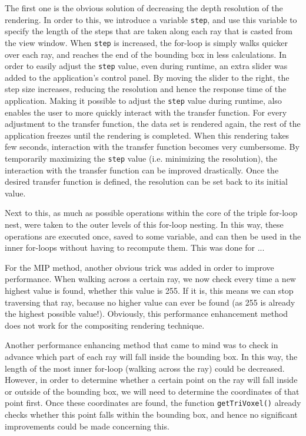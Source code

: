 The first one is the obvious solution of decreasing the depth resolution of the rendering. In order to this, we introduce a variable \texttt{step}, and use this variable to specify the length of the steps that are taken along each ray that is casted from the view window. When \texttt{step} is increased, the for-loop is simply walks quicker over each ray, and reaches the end of the bounding box in less calculations. In order to easily adjust the \texttt{step} value, even during runtime, an extra slider was added to the application's control panel. By moving the slider to the right, the step size increases, reducing the resolution and hence the response time of the application. 
Making it possible to adjust the \texttt{step} value during runtime, also enables the user to more quickly interact with the transfer function. For every adjustment to the transfer function, the data set is rendered again, the rest of the application freezes until the rendering is completed. When this rendering takes few seconds, interaction with the transfer function becomes very cumbersome. By temporarily maximizing the \texttt{step} value (i.e. minimizing the resolution), the interaction with the transfer function can be improved drastically. Once the desired transfer function is defined, the resolution can be set back to its initial value.

Next to this, as much as possible operations within the core of the triple for-loop nest, were taken to the outer levels of this for-loop nesting. In this way, these operations are executed once, saved to some variable, and can then be used in the inner for-loops without having to recompute them. This was done for ... 

For the MIP method, another obvious trick was added in order to improve performance. When walking across a certain ray, we now check every time a new highest value is found, whether this value is 255. If it is, this means we can stop traversing that ray, because no higher value can ever be found (as 255 is already the highest possible value!). Obviously, this performance enhancement method does not work for the compositing rendering technique.

Another performance enhancing method that came to mind was to check in advance which part of each ray will fall inside the bounding box. In this way, the length of the most inner for-loop (walking across the ray) could be decreased. However, in order to determine whether a certain point on the ray will fall inside or outside of the bounding box, we will need to determine the coordinates of that point first. Once these coordinates are found, the function \texttt{getTriVoxel()} already checks whether this point falls within the bounding box, and hence no significant improvements could be made concerning this.

